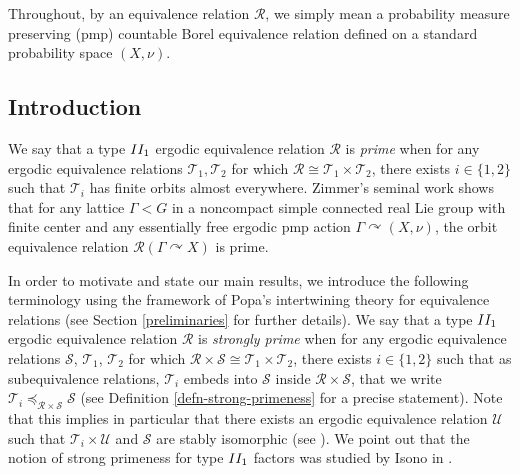 \documentclass[11pt]{amsart}
\numberwithin{equation}{section}
\theoremstyle{plain}
\theoremstyle{definition}
\begin{document}
Throughout, by an equivalence relation $\mathscr R$, we simply mean a probability measure preserving (pmp) countable Borel equivalence relation defined on a standard probability space $(X, \nu)$.

\subsection*{Introduction}

We say that a type ${\rm II_1}$ ergodic equivalence relation $\mathscr R$ is {\em prime} when for any ergodic equivalence relations $\mathscr T_1, \mathscr T_2$ for which $\mathscr R \cong \mathscr T_1 \times \mathscr T_2$, there exists $i \in \{1, 2\}$ such that $\mathscr T_i$ has finite orbits almost everywhere. Zimmer's seminal work \cite{Zi81} shows that for any lattice $\Gamma < G$ in a noncompact simple connected real Lie group with finite center and any essentially free ergodic pmp action $\Gamma \curvearrowright (X, \nu)$, the orbit equivalence relation $\mathscr R(\Gamma \curvearrowright X)$ is prime. 

In order to motivate and state our main results, we introduce the following terminology using the framework of Popa's intertwining theory for equivalence relations (see Section \ref{preliminaries} for further details). We say that a type ${\rm II_1}$ ergodic equivalence relation $\mathscr R$ is {\em strongly prime} when for any ergodic equivalence relations $\mathscr S$, $\mathscr T_1$, $\mathscr T_2$ for which $\mathscr R \times \mathscr S \cong \mathscr T_1 \times \mathscr T_2$, there exists $i \in \{1, 2\}$ such that as subequivalence relations, $\mathscr T_i$ embeds into $\mathscr S$ inside $\mathscr R \times \mathscr S$, that we write $\mathscr T_i \preceq_{\mathscr R \times \mathscr S} \mathscr S$ (see Definition \ref{defn-strong-primeness} for a precise statement). Note that this implies in particular that there exists an ergodic equivalence relation $\mathscr U$ such that $\mathscr T_i \times \mathscr U$ and $\mathscr S$ are stably isomorphic (see \cite{Sp21}). We point out that the notion of strong primeness for type ${\rm II_1}$ factors was studied by Isono in \cite{Is16}.
\end{document}
